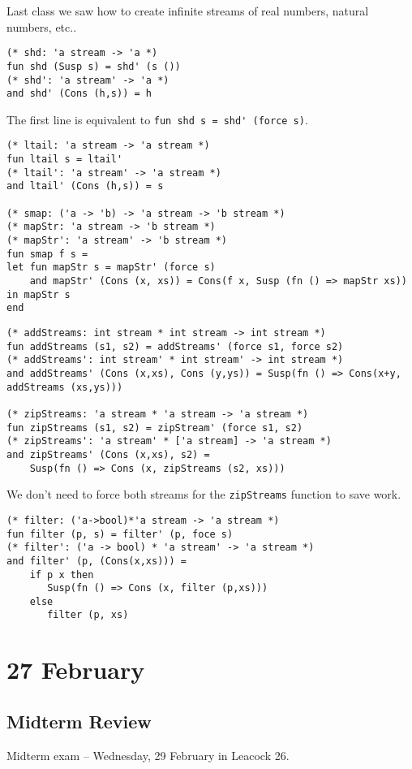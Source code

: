 \documentclass[11pt]{article}
\begin{document}
Last class we saw how to create infinite streams of real numbers, natural numbers, etc..

\begin{verbatim}
(* shd: 'a stream -> 'a *)
fun shd (Susp s) = shd' (s ()) 
(* shd': 'a stream' -> 'a *)
and shd' (Cons (h,s)) = h
\end{verbatim}

The first line is equivalent to \verb~fun shd s = shd' (force s)~.

\begin{verbatim}
(* ltail: 'a stream -> 'a stream *)
fun ltail s = ltail' 
(* ltail': 'a stream' -> 'a stream *)
and ltail' (Cons (h,s)) = s

(* smap: ('a -> 'b) -> 'a stream -> 'b stream *)
(* mapStr: 'a stream -> 'b stream *)
(* mapStr': 'a stream' -> 'b stream *)
fun smap f s =
let fun mapStr s = mapStr' (force s)
    and mapStr' (Cons (x, xs)) = Cons(f x, Susp (fn () => mapStr xs))
in mapStr s
end
\end{verbatim}

\begin{verbatim}
(* addStreams: int stream * int stream -> int stream *)
fun addStreams (s1, s2) = addStreams' (force s1, force s2)
(* addStreams': int stream' * int stream' -> int stream *)
and addStreams' (Cons (x,xs), Cons (y,ys)) = Susp(fn () => Cons(x+y, addStreams (xs,ys)))

(* zipStreams: 'a stream * 'a stream -> 'a stream *)
fun zipStreams (s1, s2) = zipStream' (force s1, s2)
(* zipStreams': 'a stream' * ['a stream] -> 'a stream *)
and zipStreams' (Cons (x,xs), s2) =
    Susp(fn () => Cons (x, zipStreams (s2, xs)))
\end{verbatim}

We don't need to force both streams for the \verb~zipStreams~ function to save work.

\begin{verbatim}
(* filter: ('a->bool)*'a stream -> 'a stream *)
fun filter (p, s) = filter' (p, foce s)
(* filter': ('a -> bool) * 'a stream' -> 'a stream *)
and filter' (p, (Cons(x,xs))) = 
    if p x then
	   Susp(fn () => Cons (x, filter (p,xs)))
    else
       filter (p, xs)
\end{verbatim}

\section{27 February}
\subsection{Midterm Review}
Midterm exam -- Wednesday, 29 February in Leacock 26.
\end{document}
